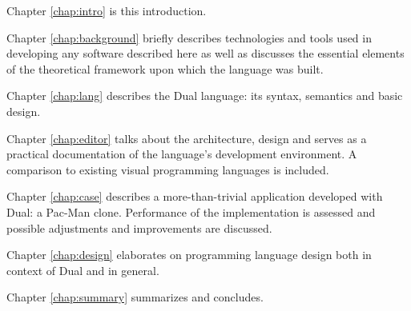 Chapter \ref{chap:intro} is this introduction.

Chapter \ref{chap:background} briefly describes technologies and tools used in developing any software described here as well as discusses the essential elements of the theoretical framework upon which the language was built.

Chapter \ref{chap:lang} describes the Dual language: its syntax, semantics and basic design.

Chapter \ref{chap:editor} talks about the architecture, design and serves as a practical documentation of the language's development environment. A comparison to existing visual programming languages is included.

Chapter \ref{chap:case} describes a more-than-trivial application developed with Dual: a Pac-Man clone. Performance of the implementation is assessed and possible adjustments and improvements are discussed.

Chapter \ref{chap:design} elaborates on programming language design both in context of Dual and in general.

Chapter \ref{chap:summary} summarizes and concludes.
